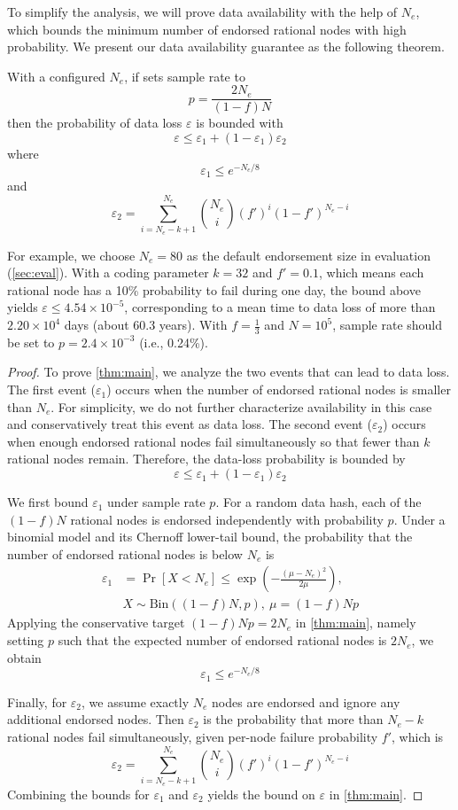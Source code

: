 To simplify the analysis, we will prove data availability with the help of $N_e$, which bounds the minimum number of endorsed rational nodes with high probability.
We present our data availability guarantee as the following theorem.
\begin{theorem}\label{thm:main}
With a configured $N_e$, if \sys sets sample rate to
$$p=\frac{2N_e}{(1-f)N}$$
then the probability of data loss $\varepsilon$ is bounded with
$$\varepsilon\leq \varepsilon_1+(1-\varepsilon_1)\varepsilon_2$$
where
$$\varepsilon_1\le e^{-N_e/8}$$
and
$$
\varepsilon_2=
\sum_{i=N_e-k+1}^{N_e}
\binom{N_e}{i}(f')^i(1-f')^{N_e-i}
$$
\end{theorem}
For example, we choose $N_e=80$ as the default endorsement size in evaluation (\cref{sec:eval}).
With a coding parameter $k=32$ and $f'=0.1$, which means each rational node has a 10\% probability to fail during one day, 
the bound above yields $\varepsilon\le 4.54\times 10^{-5}$, corresponding to a mean time to data loss of more than $2.20\times 10^{4}$ days (about 60.3 years).
With $f=\frac{1}{3}$ and $N=10^5$, sample rate should be set to $p=2.4\times10^{-3}$ (i.e., 0.24\%).

\begin{proof}
To prove \cref{thm:main}, we analyze the two events that can lead to data loss.
The first event ($\varepsilon_1$) occurs when the number of endorsed rational nodes is smaller than $N_e$.
For simplicity, we do not further characterize availability in this case and conservatively treat this event as data loss.
The second event ($\varepsilon_2$) occurs when enough endorsed rational nodes fail simultaneously so that fewer than $k$ rational nodes remain.
Therefore, the data-loss probability is bounded by
$$\varepsilon\leq \varepsilon_1+(1-\varepsilon_1)\varepsilon_2$$

We first bound $\varepsilon_1$ under sample rate $p$.
For a random data hash, each of the $(1-f)N$ rational nodes is endorsed independently with probability $p$.
Under a binomial model and its Chernoff lower-tail bound, the probability that the number of endorsed rational nodes is below $N_e$ is
$$
\begin{aligned}
\varepsilon_1
&=\Pr[X<N_e]\le\exp\!\left(-\frac{(\mu-N_e)^2}{2\mu}\right),\\
&X\sim\mathrm{Bin}((1-f)N,p),\ \mu=(1-f)Np
\end{aligned}
$$
Applying the conservative target $(1-f)Np=2N_e$ in \cref{thm:main}, namely setting $p$ such that the expected number of endorsed rational nodes is $2N_e$, we obtain
$$\varepsilon_1\le e^{-N_e/8}$$

Finally, for $\varepsilon_2$, we assume exactly $N_e$ nodes are endorsed and ignore any additional endorsed nodes.
Then $\varepsilon_2$ is the probability that more than $N_e-k$ rational nodes fail simultaneously, given per-node failure probability $f'$, which is
$$
\varepsilon_2=
\sum_{i=N_e-k+1}^{N_e}
\binom{N_e}{i}(f')^i(1-f')^{N_e-i}
$$
Combining the bounds for $\varepsilon_1$ and $\varepsilon_2$ yields the bound on $\varepsilon$ in \cref{thm:main}.
\end{proof}
